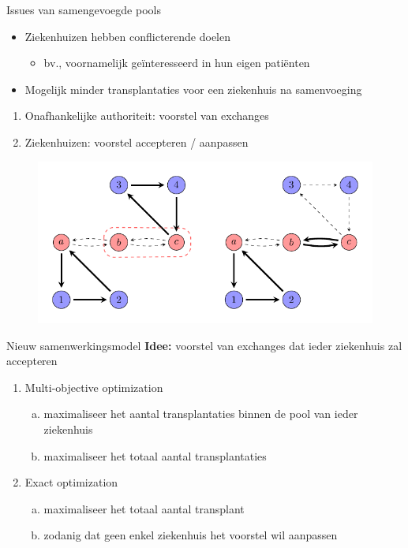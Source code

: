 \documentclass{beamer}
\begin{document}
\begin{frame}{Issues van samengevoegde pools}
	\vspace{1ex}
	\begin{itemize}
		\item Ziekenhuizen hebben conflicterende doelen
		\begin{itemize}
			\item bv., voornamelijk ge\"interesseerd in hun eigen pati\"enten
		\end{itemize}
		\item Mogelijk minder transplantaties voor een ziekenhuis na samenvoeging
	\end{itemize}
	\vspace{.5cm}
	\begin{enumerate}
		\item Onafhankelijke authoriteit: voorstel van exchanges
		\item Ziekenhuizen: voorstel accepteren / aanpassen
	\end{enumerate}
	
	\begin{figure}
		\centering
		\includegraphics[scale=0.7]{./Figures/Pictures/PartialReject.pdf}
	\end{figure}

\end{frame}

\begin{frame}{Nieuw samenwerkingsmodel}	
\textbf{Idee:} voorstel van exchanges dat ieder ziekenhuis zal accepteren
\vspace{1.5cm}
\begin{enumerate}
	\setlength\itemsep{2em}
	\item Multi-objective optimization
	\begin{enumerate}[(a)]
		\item maximaliseer het aantal transplantaties binnen de pool van ieder ziekenhuis
		\item maximaliseer het totaal aantal transplantaties

	\end{enumerate}
	\item Exact optimization
	\begin{enumerate}[(a)]
		\item maximaliseer het totaal aantal transplant
		\item zodanig dat geen enkel ziekenhuis het voorstel wil aanpassen
	\end{enumerate}
\end{enumerate}
\end{frame}
\end{document}

